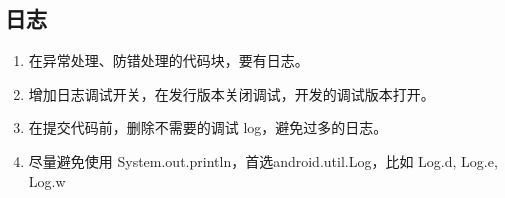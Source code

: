 \documentclass[a4paper,12pt]{article}
\begin{document}
\subsection{日志}
\begin{enumerate}
    \item 在异常处理、防错处理的代码块，要有日志。
    \item 增加日志调试开关，在发行版本关闭调试，开发的调试版本打开。
    \item 在提交代码前，删除不需要的调试 log，避免过多的日志。
    \item 尽量避免使用 System.out.println，首选android.util.Log，比如 Log.d, Log.e, Log.w
\end{enumerate}
\end{document}
